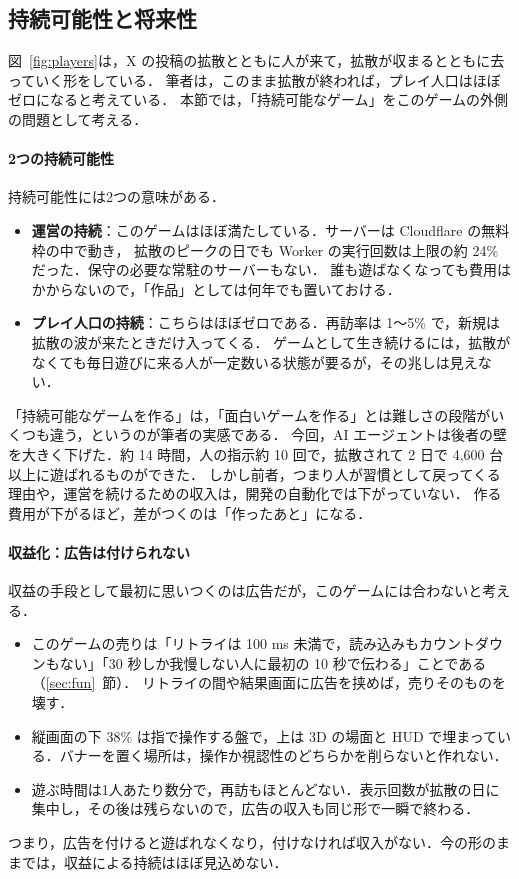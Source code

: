 \documentclass[a4paper,10pt]{ltjsarticle}
\newcommand{\figref}[1]{図~\ref{#1}}
\newcommand{\secref}[1]{\ref{#1}~節}
\begin{document}
\subsection{持続可能性と将来性}
\label{sec:sustain}
\figref{fig:players}は，X の投稿の拡散とともに人が来て，拡散が収まるとともに去っていく形をしている．
筆者は，このまま拡散が終われば，プレイ人口はほぼゼロになると考えている．
本節では，「持続可能なゲーム」をこのゲームの外側の問題として考える．

\paragraph{2つの持続可能性} 持続可能性には2つの意味がある．
\begin{itemize}
  \item \textbf{運営の持続}：このゲームはほぼ満たしている．サーバーは Cloudflare の無料枠の中で動き，
  拡散のピークの日でも Worker の実行回数は上限の約 24\% だった．保守の必要な常駐のサーバーもない．
  誰も遊ばなくなっても費用はかからないので，「作品」としては何年でも置いておける．
  \item \textbf{プレイ人口の持続}：こちらはほぼゼロである．再訪率は 1〜5\% で，新規は拡散の波が来たときだけ入ってくる．
  ゲームとして生き続けるには，拡散がなくても毎日遊びに来る人が一定数いる状態が要るが，その兆しは見えない．
\end{itemize}
「持続可能なゲームを作る」は，「面白いゲームを作る」とは難しさの段階がいくつも違う，というのが筆者の実感である．
今回，AI エージェントは後者の壁を大きく下げた．約 14 時間，人の指示約 10 回で，拡散されて 2 日で 4,600 台以上に遊ばれるものができた．
しかし前者，つまり人が習慣として戻ってくる理由や，運営を続けるための収入は，開発の自動化では下がっていない．
作る費用が下がるほど，差がつくのは「作ったあと」になる．

\paragraph{収益化：広告は付けられない} 収益の手段として最初に思いつくのは広告だが，このゲームには合わないと考える．
\begin{itemize}
  \item このゲームの売りは「リトライは 100 ms 未満で，読み込みもカウントダウンもない」「30 秒しか我慢しない人に最初の 10 秒で伝わる」ことである（\secref{sec:fun}）．
  リトライの間や結果画面に広告を挟めば，売りそのものを壊す．
  \item 縦画面の下 38\% は指で操作する盤で，上は 3D の場面と HUD で埋まっている．バナーを置く場所は，操作か視認性のどちらかを削らないと作れない．
  \item 遊ぶ時間は1人あたり数分で，再訪もほとんどない．表示回数が拡散の日に集中し，その後は残らないので，広告の収入も同じ形で一瞬で終わる．
\end{itemize}
つまり，広告を付けると遊ばれなくなり，付けなければ収入がない．今の形のままでは，収益による持続はほぼ見込めない．
\end{document}
